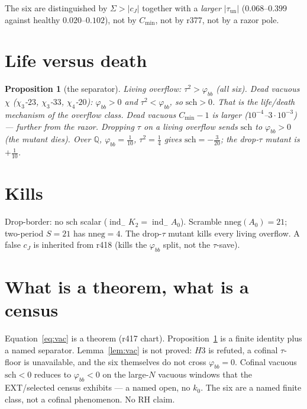 \documentclass[11pt]{article}
\newtheorem{prop}{Proposition}
\theoremstyle{remark}
\newcommand{\phibb}{\varphi_{bb}}
\newcommand{\sch}{\mathrm{sch}}
\newcommand{\indm}{\operatorname{ind}_{-}}
\begin{document}
The six are distinguished by $\Sigma>|c_{J}|$ together
with a \emph{larger} $|\tau_{\mathrm{un}}|$
($0.068$--$0.399$ against healthy $0.020$--$0.102$),
not by $C_{\min}$, not by r377, not by a razor pole.

\section{Life versus death}\label{sec:life}

\begin{prop}[the separator]\label{prop:life}
Living overflow: $\tau^{2}>\phibb$ (all six).
Dead vacuous $\chi$ ($\chi_{3}$-$23$, $\chi_{3}$-$33$,
$\chi_{4}$-$20$): $\phibb>0$ and $\tau^{2}<\phibb$,
so $\sch>0$.
That is the life/death mechanism of the overflow class.
Dead vacuous $C_{\min}-1$ is larger
($10^{-4}$--$3\cdot 10^{-3}$) --- further from the razor.
Dropping $\tau$ on a living overflow sends $\sch$ to
$\phibb>0$ (the mutant dies).
Over $\mathbb{Q}$,
$\phibb=\tfrac1{10}$, $\tau^{2}=\tfrac14$ gives
$\sch=-\tfrac3{20}$; the drop-$\tau$ mutant is
$+\tfrac1{10}$.
\end{prop}

\section{Kills}\label{sec:kills}

Drop-border: no $\sch$ scalar ($\indm K_{2}=\indm A_{0}$).
Scramble $\mathrm{nneg}(A_{0})=21$; two-period $S=21$
has $\mathrm{nneg}=4$.
The drop-$\tau$ mutant kills every living overflow.
A false $c_{J}$ is inherited from r418 (kills the
$\phibb$ split, not the $\tau$-save).

\section{What is a theorem, what is a census}\label{sec:honest}

Equation~\eqref{eq:vac} is a theorem (r417 chart).
Proposition~\ref{prop:life} is a finite identity plus a
named separator.
Lemma~\ref{lem:vac} is not proved:
$H3$ is refuted, a cofinal $\tau$-floor is unavailable,
and the six themselves do not cross $\phibb=0$.
Cofinal vacuous $\sch<0$ reduces to $\phibb<0$ on the
large-$N$ vacuous windows that the EXT/selected census
exhibits --- a named open, no $k_{0}$.
The six are a named finite class, not a cofinal
phenomenon.
No RH claim.
\end{document}
